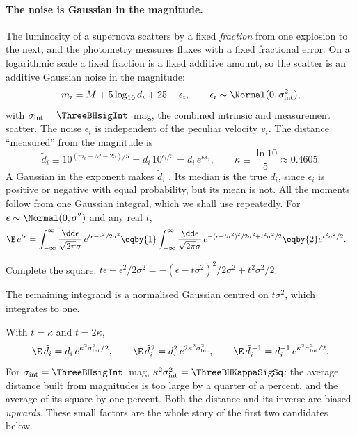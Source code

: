 \paragraph{The noise is Gaussian in the magnitude.}
The luminosity of a supernova scatters by a fixed \emph{fraction} from one
explosion to the next, and the photometry measures fluxes with a fixed
fractional error. On a logarithmic scale a fixed fraction is a fixed
additive amount, so the scatter is an additive Gaussian noise in the
magnitude:
\begin{equation}
  m_i=M+5\log_{10}d_i+25+\epsilon_i,\qquad \epsilon_i\sim\Normal(0,\sigma_{\rm int}^2),
  \label{3b:eq:sn-mag}
\end{equation}
with $\sigma_{\rm int}=\ThreeBHsigInt$~mag, the combined intrinsic and
measurement scatter. The noise $\epsilon_i$ is independent of the peculiar
velocity $v_i$. The distance ``measured'' from the magnitude is
\begin{equation}
  \tilde d_i\equiv10^{(m_i-M-25)/5}=d_i\,10^{\epsilon_i/5}=d_i\,e^{\kappa\epsilon_i},
  \qquad\kappa\equiv\frac{\ln10}{5}\approx0.4605 .
  \label{3b:eq:dtilde}
\end{equation}
A Gaussian in the exponent makes $\tilde d_i$ 
. Its median is the true $d_i$,
since $\epsilon_i$ is positive or negative with equal probability, but its
mean is not. All the moments follow from one Gaussian integral, which we
shall use repeatedly. For $\epsilon\sim\Normal(0,\sigma^2)$ and any real $t$,
\begin{align}
  \E\,e^{t\epsilon}
  &=\int_{-\infty}^{\infty}\frac{\dd\epsilon}{\sqrt{2\pi}\sigma}\,
    e^{t\epsilon-\epsilon^2/2\sigma^2}
   \eqby{1}\int_{-\infty}^{\infty}\frac{\dd\epsilon}{\sqrt{2\pi}\sigma}\,
    e^{-(\epsilon-t\sigma^2)^2/2\sigma^2+t^2\sigma^2/2}
   \eqby{2}e^{t^2\sigma^2/2} .
  \label{3b:eq:lognormal-mgf}
\end{align}
\begin{explain}
  \item Complete the square:
        $t\epsilon-\epsilon^2/2\sigma^2=-(\epsilon-t\sigma^2)^2/2\sigma^2+t^2\sigma^2/2$.
  \item The remaining integrand is a normalised Gaussian centred on $t\sigma^2$,
        which integrates to one.
\end{explain}
With $t=\kappa$ and $t=2\kappa$,
\begin{equation}
  \E\,\tilde d_i=d_i\,e^{\kappa^2\sigma_{\rm int}^2/2},
  \qquad
  \E\,\tilde d_i^{\,2}=d_i^2\,e^{2\kappa^2\sigma_{\rm int}^2},
  \qquad
  \E\,\tilde d_i^{\,-1}=d_i^{-1}\,e^{\kappa^2\sigma_{\rm int}^2/2}.
  \label{3b:eq:dtilde-moments}
\end{equation}
For $\sigma_{\rm int}=\ThreeBHsigInt$~mag, $\kappa^2\sigma_{\rm int}^2=\ThreeBHKappaSigSq$:
the average distance built from magnitudes is too large by a quarter of a
percent, and the average of its square by one percent. Both the distance
and its inverse are biased \emph{upwards}. These small factors are the whole
story of the first two candidates below.

